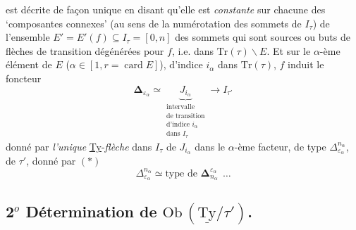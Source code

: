 \documentclass[11pt]{article}
\newcommand{\printedpage}[1]{\marginpar{\footnotesize p.~#1}}
\newcommand{\msp}[1]{\marginpar{\footnotesize [#1]}}
\newcommand{\uTy}{\underline{\mathrm{Ty}}}
\begin{document}
\printedpage{29}
\msp{page 45}est décrite de façon unique en disant qu'elle est \textit{constante} sur chacune des `composantes connexes' (au sens de la numérotation des sommets de $I_\tau$) de l'ensemble $E' = E'(f) \subseteq I_\tau = [0,n]$ des sommets qui sont sources ou buts de flèches de transition dégénérées pour $f$, i.e. dans $\mathrm{Tr}(\tau)\backslash E$. Et sur le $\alpha$-ème élément de $E$ ($\alpha \in [1, r = \operatorname{card} E]$), d'indice $i_\alpha$ dans $\mathrm{Tr}(\tau)$, $f$ induit le foncteur
\[
\boldsymbol{\Delta}_{\varepsilon_\alpha} \simeq \underbrace{J_{i_\alpha}}_{\substack{\text{intervalle}\\ \text{de transition}\\ \text{d'indice } i_\alpha\\ \text{dans } I_\tau}} \longrightarrow I_{\tau'}
\]
donné par \textit{l'unique} \underline{Ty}-\textit{flèche} dans $I_\tau$ de $J_{i_\alpha}$ dans le $\alpha$-ème facteur, de type $\Delta^{n_\alpha}_{\varepsilon_\alpha}$, de $\tau'$, donné par $(*)$
\[
\Delta^{n_\alpha}_{\varepsilon_\alpha} \simeq \text{type de } \boldsymbol{\Delta}^{\varepsilon_\alpha}_{n_\alpha}\ \ \ldots
\]

\subsection*{2$^o$ Détermination de $\mathrm{Ob}\,(\uTy/\tau')$.}
\end{document}
